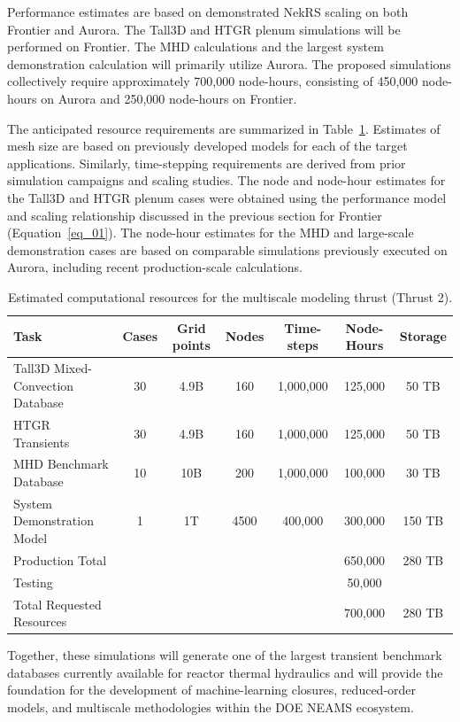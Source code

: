 Performance estimates are based on demonstrated NekRS scaling on both Frontier and Aurora. The Tall3D and HTGR plenum simulations will be performed on Frontier. The MHD calculations and the largest system demonstration calculation will primarily utilize Aurora. The proposed simulations collectively require approximately 700,000 node-hours, consisting of 450,000 node-hours on Aurora and 250,000 node-hours on Frontier.

The anticipated resource requirements are summarized in Table~\ref{tab:multiscale_resources}. Estimates of mesh size are based on previously developed models for each of the target applications. Similarly, time-stepping requirements are derived from prior simulation campaigns and scaling studies. The node and node-hour estimates for the Tall3D and HTGR plenum cases were obtained using the performance model and scaling relationship discussed in the previous section for Frontier (Equation~\ref{eq_01}). The node-hour estimates for the MHD and large-scale demonstration cases are based on comparable simulations previously executed on Aurora, including recent production-scale calculations.

\begin{table}[htbp]
\centering
\caption{Estimated computational resources for the multiscale modeling thrust (Thrust 2).}
\label{tab:multiscale_resources}
\begin{tabular}{lcccccc}
\hline
Task & Cases & Grid points & Nodes & Time-steps & Node-Hours & Storage \\
\hline
Tall3D Mixed-Convection Database & 30 & 4.9B & 160 & 1,000,000 & 125,000 & 50 TB \\ 
HTGR Transients                  & 30 & 4.9B & 160 & 1,000,000 & 125,000 & 50 TB \\
MHD Benchmark Database           & 10 & 10B & 200 & 1,000,000 & 100,000 & 30 TB \\
System Demonstration Model       & 1  & 1T & 4500 & 400,000 & 300,000 & 150 TB \\
\hline
Production Total & & & & & 650,000 & 280 TB \\
Testing          & & & & & 50,000 &  \\
\hline
Total Requested Resources & & & & & 700,000 & 280 TB \\
\hline
\end{tabular}
\end{table}

Together, these simulations will generate one of the largest transient benchmark databases currently available for reactor thermal hydraulics and will provide the foundation for the development of machine-learning closures, reduced-order models, and multiscale methodologies within the DOE NEAMS ecosystem.


